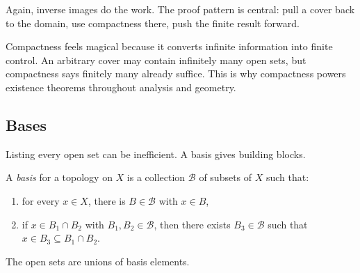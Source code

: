 Again, inverse images do the work. The proof pattern is central: pull a cover
back to the domain, use compactness there, push the finite result forward.

\begin{aestheticbox}
Compactness feels magical because it converts infinite information into finite
control. An arbitrary cover may contain infinitely many open sets, but compactness
says finitely many already suffice. This is why compactness powers existence
theorems throughout analysis and geometry.
\end{aestheticbox}

\begin{center}
\end{center}

\subsection{Bases}

Listing every open set can be inefficient. A basis gives building blocks.

\begin{definition}
A \emph{basis} for a topology on $X$ is a collection $\mathcal{B}$ of subsets
of $X$ such that:
\begin{enumerate}
\item for every $x\in X$, there is $B\in\mathcal{B}$ with $x\in B$,
\item if $x\in B_1\cap B_2$ with $B_1,B_2\in\mathcal{B}$, then there exists
$B_3\in\mathcal{B}$ such that $x\in B_3\subseteq B_1\cap B_2$.
\end{enumerate}
The open sets are unions of basis elements.
\end{definition}

